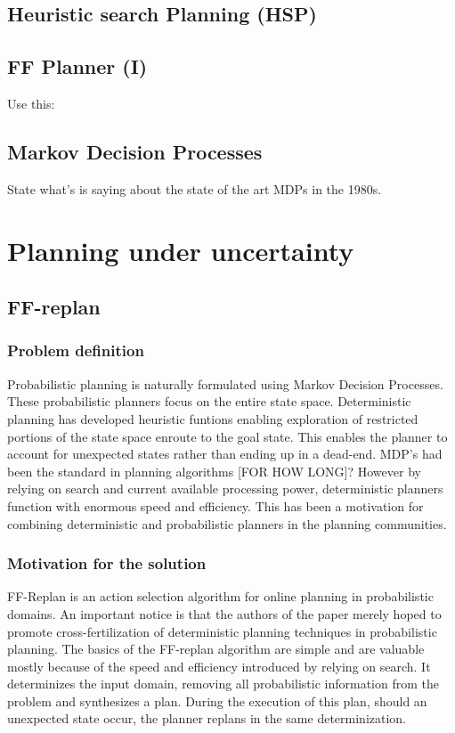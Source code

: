 \documentclass[runningheads,a4paper]{llncs}
\begin{document}
\subsection{Heuristic search Planning (HSP)}

\subsection{FF Planner (I)}
Use this: \cite{Hoffmann01theff}

\subsection{Markov Decision Processes}

State what's \cite{monahan1982state} is saying about the state of the art MDPs
in the 1980s.



\section{Planning under uncertainty}

\subsection{FF-replan \cite{FFReplan}}

\subsubsection{Problem definition}
Probabilistic planning is naturally formulated using Markov Decision Processes. These probabilistic planners focus on the entire state space. Deterministic planning has developed heuristic funtions enabling exploration of restricted portions of the state space enroute to the goal state. This enables the planner to account for unexpected states rather than ending up in a dead-end. MDP's had been the standard in planning algorithms [FOR HOW LONG]? However by relying on search and current available processing power, deterministic planners function with enormous speed and efficiency. This has been a motivation for combining deterministic and probabilistic planners in the planning communities.

\subsubsection{Motivation for the solution}
FF-Replan is an action selection algorithm for online planning in probabilistic domains. An important notice is that the authors of the paper merely hoped to promote cross-fertilization of deterministic planning techniques in probabilistic planning. The basics of the FF-replan algorithm are simple and are valuable mostly because of the speed and efficiency introduced by relying on search.  It determinizes the input domain, removing all probabilistic information from the problem and synthesizes a plan. During the execution of this plan, should an unexpected state occur, the planner replans in the same determinization.
\end{document}
